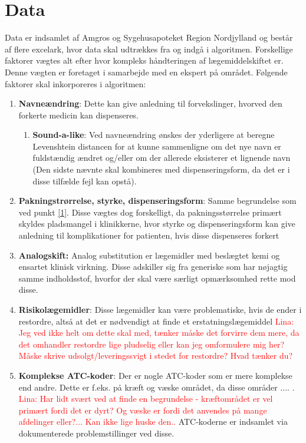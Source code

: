 \section{Data}
Data er indsamlet af Amgros og Sygehusapoteket Region Nordjylland og består af flere excelark, hvor data skal udtrækkes fra og indgå i algoritmen. Forskellige faktorer vægtes alt efter hvor kompleks håndteringen af lægemiddelskiftet er. Denne vægten er foretaget i samarbejde med en ekspert på området. Følgende faktorer skal inkorporeres i algoritmen: 
\begin{enumerate}
\item \label{1} \textbf{Navneændring}: Dette kan give anledning til forvekslinger, hvorved den forkerte medicin kan dispenseres.
\begin{enumerate}
\item \textbf{Sound-a-like}: Ved navneændring ønskes der yderligere at beregne Levenshtein distancen for at kunne sammenligne om det nye navn er fuldstændig ændret og/eller om der allerede eksisterer et lignende navn (Den sidste nævnte skal kombineres med dispenseringsform, da det er i disse tilfælde fejl kan opstå).
\end{enumerate} \vspace{2mm}
\item  \textbf{Pakningstrørrelse, styrke, dispenseringsform}: Samme begrundelse som ved punkt \ref{1}. Disse vægtes dog forskelligt, da pakningsstørrelse primært skyldes pladsmangel i klinikkerne, hvor styrke og dispenseringsform kan give anledning til komplikationer for patienten, hvis disse dispenseres forkert \vspace{2mm}
\item \textbf{Analogskift:} Analog substitution er lægemidler med beslægtet kemi og ensartet klinisk virkning. Disse adskiller sig fra generiske som har nøjagtig samme indholdsstof, hvorfor der skal være særligt opmærksomhed rette mod disse. \vspace{2mm}
\item \textbf{Risikolægemidler}: Disse lægemidler kan være problematiske, hvis de ender i restordre, altså at det er nødvendigt at finde et erstatningslægemiddel \textcolor{red}{Lina: Jeg ved ikke helt om dette skal med, tænker måske det forvirre dem mere, da det omhandler restordre lige pludselig eller kan jeg omformulere mig her? Måske skrive udsolgt/leveringssvigt i stedet for restordre? Hvad tænker du?}\vspace{2mm}
\item \textbf{Komplekse ATC-koder}: Der er nogle ATC-koder som er mere komplekse end andre. Dette er f.eks. på kræft og væske området, da disse områder .... . \textcolor{red}{Lina: Har lidt svært ved at finde en begrundelse - kræftområdet er vel primært fordi det er dyrt? Og væske er fordi det anvendes på mange afdelinger eller?... Kan ikke lige huske den..} ATC-koderne er indsamlet via dokumenterede problemstillinger ved disse.

\end{enumerate}
